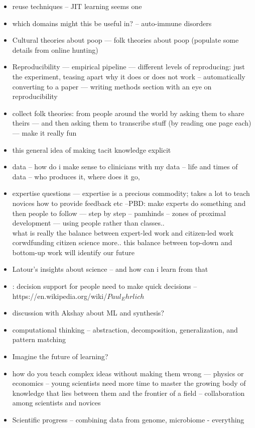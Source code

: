 \begin{itemize}
\item reuse techniques -- JIT learning seems one
\item which domains might this be useful in?	
-- auto-immune disorders
\item Cultural theories about poop — folk theories about poop 
(populate some details from online hunting)
\item Reproducibility — empirical pipeline 
— different levels of reproducing: just the experiment, teasing apart why it does or does not work
-- automatically converting to a paper — writing methods section with an eye on reproducibility 
\item collect folk theories: from people around the world by asking them to share theirs
— and then asking them to transcribe stuff (by reading one page each) — make it really fun
\item this general idea of making tacit knowledge explicit 
\item data -- how do i make sense to clinicians with my data -- life and times of data -- who produces it, where does it go, 
\item expertise questions --- expertise is a precious commodity; takes a lot to teach novices how to provide feedback etc  --PBD: make experts do something and then people to follow — step by step -- pamhinds -- zones of proximal development — using people rather than classes.. \\
 what is really the balance between expert-led work and citizen-led work
    corwdfunding
    citizen science
    more.. 
this balance between top-down and bottom-up work will identify our future
\item Latour's insights about science -- and how can i learn from that
\item : decision support for people need to make quick decisions -- https://en.wikipedia.org/wiki/$Paul_Ehrlich$
\item discussion with Akshay about ML and synthesis?
\item computational thinking -- abstraction, decomposition, generalization, and pattern matching
\item Imagine the future of learning?
\item how do you teach complex ideas without making them wrong 
    — physics or economics
-- young scientists need more time to master the growing body of knowledge that lies between them and the frontier of a field -- collaboration among scientists and novices
\item Scientific progress -- combining data from genome, microbiome - everything
\end{itemize}

